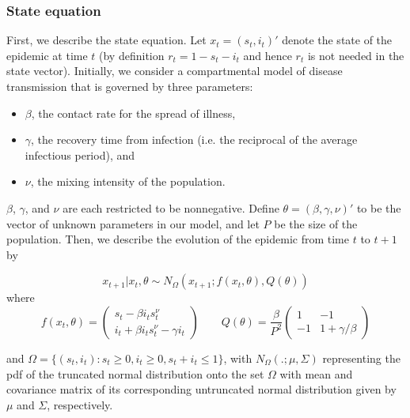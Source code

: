 \documentclass{elsarticle}
\begin{document}
\subsubsection{State equation \label{sec:state}}

First, we describe the state equation. Let $x_t = (s_t,i_t)'$ denote the state of the epidemic at time $t$ (by definition $r_t=1-s_t-i_t$ and hence $r_t$ is not needed in the state vector). Initially, we consider a compartmental model of disease transmission that is governed by three parameters:

\begin{itemize}
\item $\beta$, the contact rate for the spread of illness,
\item $\gamma$, the recovery time from infection (i.e. the reciprocal of the average infectious period), and
\item $\nu$, the mixing intensity of the population.
\end{itemize}

\noindent $\beta$, $\gamma$, and $\nu$ are each restricted to be nonnegative. Define $\theta = (\beta,\gamma,\nu)'$ to be the vector of unknown parameters in our model, and let $P$ be the size of the population. Then, we describe the evolution of the epidemic from time $t$ to $t + 1$ by

\begin{equation}
x_{t+1}\left|x_t,\theta\right. \sim N_\Omega\left(x_{t+1};f(x_t,\theta),Q(\theta)\right) \label{eqn:state}
\end{equation}
\noindent where
\[
f(x_t,\theta) = \left(
\begin{array}{c}
s_t - \beta i_ts^\nu_t \phantom{- \gamma i_t}\,\, \\
i_t +  \beta i_ts^\nu_t - \gamma i_t
\end{array}
\right)
\qquad
Q(\theta) = \frac{\beta}{P^2} \left(
\begin{array}{ccccc}
1 & -1 \\
-1 & 1 + \gamma/\beta
\end{array}
\right)
\]

\noindent and $\Omega = \{(s_t,i_t): s_t \ge 0, i_t \ge 0, s_t + i_t \le 1\}$, with $N_{\Omega}(.; \mu,\Sigma)$ representing the pdf of the truncated normal distribution onto the set $\Omega$ with mean and covariance matrix of its corresponding untruncated normal distribution given by $\mu$ and $\Sigma$, respectively.
\end{document}
